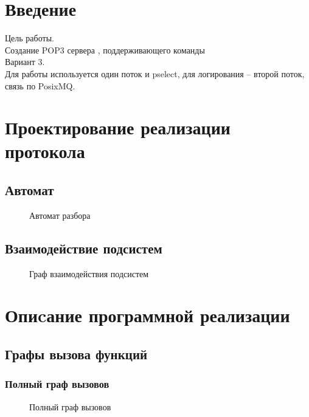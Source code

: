 



\tableofcontents

\chapter{Введение}
Цель работы.\\ Создание POP3 сервера , поддерживающего команды \\
Вариант 3.\\ Для работы используется один поток и pselect, для логирования -- второй поток, связь по PosixMQ. 

\chapter{Проектирование реализации протокола}
\section{Автомат}

\begin{figure}
\caption{Автомат разбора}
\label{automata:image}
\end{figure}

\section{Взаимодействие подсистем}
\begin{figure}
\caption{Граф взаимодействия подсистем}
\label{ssystems:image}
\end{figure}

\chapter{Опиcание программной реализации}
\section{Графы вызова функций}
\subsection{Полный граф вызовов}
\begin{figure}
\caption{Полный граф вызовов}
\label{everything:image}
\end{figure}

